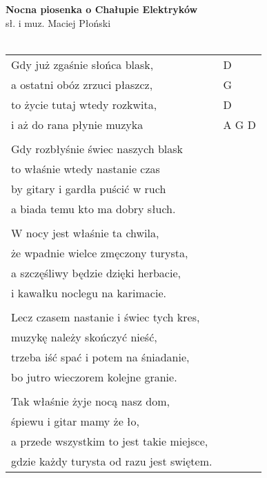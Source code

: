 \documentclass[a5paper]{article}
\begin{document}


\noindent
\fontsize{12pt}{15pt}\selectfont
\textbf{Nocna piosenka o Chałupie Elektryków} \\
\fontsize{8pt}{10pt}\selectfont
sł. i muz. Maciej Płoński \\ \\
\fontsize{10pt}{12pt}\selectfont
{}
\begin{tabular}{@{}p{7.50cm}p{3cm}@{}}
\noindent
Gdy już zgaśnie słońca blask, & D \\
a ostatni obóz zrzuci płaszcz, & G \\
to życie tutaj wtedy rozkwita, & D \\
i aż do rana płynie muzyka & A G D \\ \\

Gdy rozbłyśnie świec naszych blask \\
to właśnie wtedy nastanie czas \\
by gitary i gardła puścić w ruch \\
a biada temu kto ma dobry słuch. \\ \\

W nocy jest właśnie ta chwila, \\
że wpadnie wielce zmęczony turysta, \\
a szczęśliwy będzie dzięki herbacie, \\
i kawałku noclegu na karimacie. \\ \\

Lecz czasem nastanie i świec tych kres, \\
muzykę należy skończyć nieść, \\
trzeba iść spać i potem na śniadanie, \\
bo jutro wieczorem kolejne granie. \\ \\

Tak właśnie żyje nocą nasz dom, \\
śpiewu i gitar mamy że ło, \\
a przede wszystkim to jest takie miejsce, \\
gdzie każdy turysta od razu jest swiętem.
\end{tabular}
\end{document}
